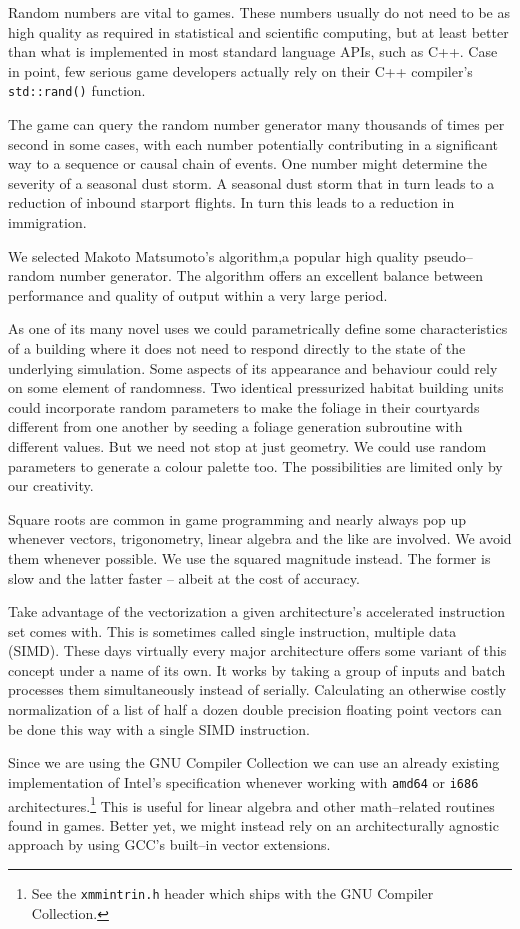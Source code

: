 Random numbers are vital to games. These numbers usually do not need to be as high quality as required in statistical and scientific computing, but at least better than what is implemented in most standard language APIs, such as C++. Case in point, few serious game developers actually rely on their C++ compiler's {\tt std::rand()} function.

The game can query the random number generator many thousands of times per second in some cases, with each number potentially contributing in a significant way to a sequence or causal chain of events. One number might determine the severity of a seasonal dust storm. A seasonal dust storm that in turn leads to a reduction of inbound starport flights. In turn this leads to a reduction in immigration.

We selected Makoto Matsumoto's algorithm, a popular high quality pseudo--random number generator. The algorithm offers an excellent balance between performance and quality of output within a very large period.

As one of its many novel uses we could parametrically define some characteristics of a building where it does not need to respond directly to the state of the underlying simulation. Some aspects of its appearance and behaviour could rely on some element of randomness. Two identical pressurized habitat building units could incorporate random parameters to make the foliage in their courtyards different from one another by seeding a foliage generation subroutine with different values. But we need not stop at just geometry. We could use random parameters to generate a colour palette too. The possibilities are limited only by our creativity.

Square roots are common in game programming and nearly always pop up whenever vectors, trigonometry, linear algebra and the like are involved. We avoid them whenever possible. We use the squared magnitude instead. The former is slow and the latter faster -- albeit at the cost of accuracy.

Take advantage of the vectorization a given architecture's accelerated instruction set comes with. This is sometimes called single instruction, multiple data (SIMD). These days virtually every major architecture offers some variant of this concept under a name of its own. It works by taking a group of inputs and batch processes them simultaneously instead of serially. Calculating an otherwise costly normalization of a list of half a dozen double precision floating point vectors can be done this way with a single SIMD instruction.

Since we are using the GNU Compiler Collection we can use an already existing implementation of Intel's specification whenever working with {\tt amd64} or {\tt i686} architectures.\footnote{See the {\tt xmmintrin.h} header which ships with the GNU Compiler Collection.} This is useful for linear algebra and other math--related routines found in games. Better yet, we might instead rely on an architecturally agnostic approach by using GCC's built--in vector extensions.

